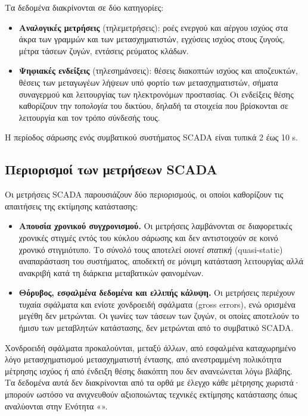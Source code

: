Τα δεδομένα διακρίνονται σε δύο κατηγορίες:

\begin{itemize}
\item \textbf{Αναλογικές μετρήσεις} (τηλεμετρήσεις): ροές ενεργού και αέργου ισχύος στα
      άκρα των γραμμών και των μετασχηματιστών, εγχύσεις ισχύος στους ζυγούς, μέτρα τάσεων
      ζυγών, εντάσεις ρεύματος κλάδων.
\item \textbf{Ψηφιακές ενδείξεις} (τηλεσημάνσεις): θέσεις διακοπτών ισχύος και αποζευκτών,
      θέσεις των μεταγωγέων λήψεων υπό φορτίο των μετασχηματιστών, σήματα συναγερμού και
      λειτουργίας των ηλεκτρονόμων προστασίας. Οι ενδείξεις θέσης καθορίζουν την
      \emph{τοπολογία} του δικτύου, δηλαδή τα στοιχεία που βρίσκονται σε λειτουργία και τον
      τρόπο σύνδεσής τους.
\end{itemize}

Η περίοδος σάρωσης ενός συμβατικού συστήματος SCADA είναι τυπικά 2 έως 10 s.

\subsection{Περιορισμοί των μετρήσεων SCADA}

Οι μετρήσεις SCADA παρουσιάζουν δύο περιορισμούς, οι οποίοι καθορίζουν τις απαιτήσεις της
εκτίμησης κατάστασης:

\begin{itemize}
\item \textbf{Απουσία χρονικού συγχρονισμού.} Οι μετρήσεις λαμβάνονται σε διαφορετικές
      χρονικές στιγμές εντός του κύκλου σάρωσης και δεν αντιστοιχούν σε κοινό χρονικό
      στιγμιότυπο. Το σύνολό τους αποτελεί \emph{οιονεί στατική} (quasi-static)
      αναπαράσταση του συστήματος, αποδεκτή σε μόνιμη κατάσταση λειτουργίας αλλά
      ανακριβή κατά τη διάρκεια μεταβατικών φαινομένων.
\item \textbf{Θόρυβος, εσφαλμένα δεδομένα και ελλιπής κάλυψη.} Οι μετρήσεις περιέχουν
      τυχαία σφάλματα και ενίοτε χονδροειδή σφάλματα (gross errors), ενώ ορισμένα μεγέθη
      δεν μετρώνται. Οι γωνίες των τάσεων των ζυγών, οι οποίες αποτελούν το ήμισυ των
      μεταβλητών κατάστασης, δεν μετρώνται από το συμβατικό SCADA.
\end{itemize}

Χονδροειδή σφάλματα προκαλούνται, μεταξύ άλλων, από εσφαλμένα καταχωρημένο λόγο
μετασχηματισμού μετασχηματιστή έντασης, από ανεστραμμένη πολικότητα μέτρησης ισχύος ή από
ένδειξη θέσης διακόπτη που δεν ανανεώνεται λόγω βλάβης. Τα δεδομένα αυτά δεν διακρίνονται
από τα ορθά με έλεγχο κάθε μέτρησης χωριστά· μπορούν ωστόσο να ανιχνευθούν αξιοποιώντας τεχνικές εκτίμησης κατάστασης όπως αναλύονται στην Ενότητα «».
